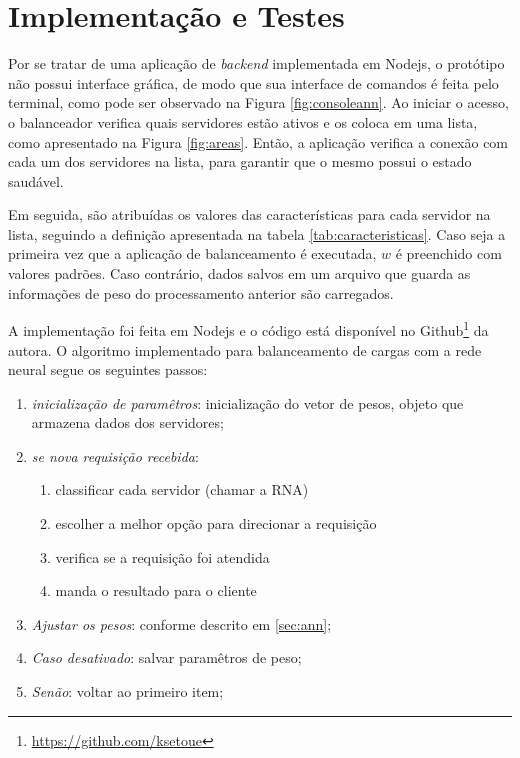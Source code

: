 \section{Implementação e Testes}\label{sec:testes}

Por se tratar de uma aplicação de \textit{backend} implementada em Nodejs, o protótipo não possui interface gráfica, de modo que sua interface de comandos é feita pelo terminal, como pode ser observado na Figura \ref{fig:consoleann}. Ao iniciar o acesso, o balanceador verifica quais servidores estão ativos e os coloca em uma lista, como apresentado na Figura \ref{fig:areas}. Então, a aplicação verifica a conexão com cada um dos servidores na lista, para garantir que o mesmo possui o estado saudável. 

Em seguida, são atribuídas os valores das características para cada servidor na lista, seguindo a definição apresentada na tabela \ref{tab:caracteristicas}. Caso seja a primeira vez que a aplicação de balanceamento é executada, $w$ é preenchido com valores padrões. Caso contrário, dados salvos em um arquivo que guarda as informações de peso do processamento anterior são carregados. 


A implementação foi feita em Nodejs e o código está disponível no Github\footnote{\url{https://github.com/ksetoue}} da autora. O algoritmo implementado para balanceamento de cargas com a rede neural segue os seguintes passos: 
\begin{enumerate}
	\item \textit{inicialização de paramêtros}: inicialização do vetor de pesos, objeto que armazena dados dos servidores;
	\item \textit{se nova requisição recebida}: 
	\begin{enumerate}
		\item classificar cada servidor (chamar a RNA)
		\item escolher a melhor opção para direcionar a requisição 
		\item verifica se a requisição foi atendida 
		\item manda o resultado para o cliente 			
	\end{enumerate}
	\item \textit{Ajustar os pesos}: conforme descrito em \ref{sec:ann};
	\item \textit{Caso desativado}: salvar paramêtros de peso; 
	\item \textit{Senão}: voltar ao primeiro item; 
\end{enumerate}

